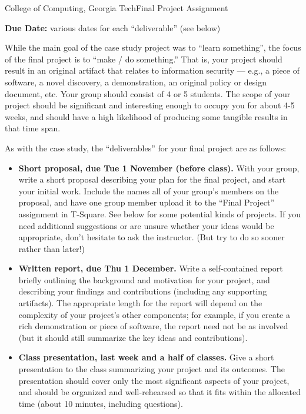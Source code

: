 \documentclass[11pt]{article}
\begin{document}


{College of Computing, Georgia Tech}{Final Project Assignment}


{\bf Due Date:} various dates for each “deliverable” (see below)

While the main goal of the case study project was to ``learn something'',
the focus of the ﬁnal project is to “make / do something.” That is, your
project should result in an original artifact that relates to
information security — e.g., a piece of software, a novel discovery, a
demonstration, an original policy or design document, etc. Your group
should consist of 4 or 5 students. The scope of your project should be
signiﬁcant and interesting enough to occupy you for about 4-5 weeks, and
should have a high likelihood of producing some tangible results in that
time span.

As with the case study, the ``deliverables'' for your ﬁnal project are as follows:

\begin{itemize}
\itemsep=-1pt
\item {\bf Short proposal, due Tue 1 November (before class).} With your
  group, write a short proposal describing your plan for the ﬁnal
  project, and start your initial work. Include the names all of your
  group’s members on the proposal, and have one group member upload it
  to the “Final Project” assignment in T-Square. See below for some
  potential kinds of projects. If you need additional suggestions or are
  unsure whether your ideas would be appropriate, don’t hesitate to ask
  the instructor.  (But try to do so sooner rather than later!)

\item {\bf Written report, due Thu 1 December.} Write a self-contained report
  brieﬂy outlining the background and motivation for your project, and
  describing your ﬁndings and contributions (including any supporting
  artifacts). The appropriate length for the report will depend on the
  complexity of your project’s other components; for example, if you
  create a rich demonstration or piece of software, the report need not
  be as involved (but it should still summarize the key ideas and
  contributions).

\item {\bf Class presentation, last week and a half of classes.} Give a
  short presentation to the class summarizing your project and its
  outcomes. The presentation should cover only the most signiﬁcant
  aspects of your project, and should be organized and well-rehearsed so
  that it ﬁts within the allocated time (about 10 minutes, including
  questions).
\end{itemize}
\end{document}
